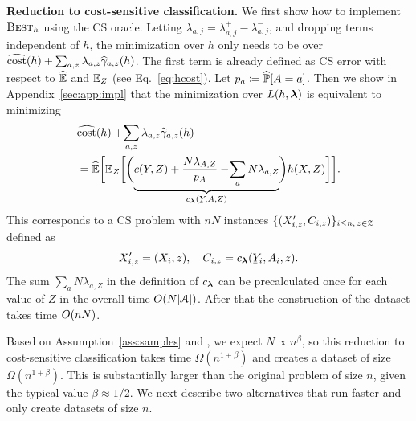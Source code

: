 \documentclass{article}
\begin{document}
\textbf{Reduction to cost-sensitive classification.}
We first show how to implement $\textsc{\mdseries Best}_h$ using the CS oracle.
Letting $\lambda_{a,j}=\lambda^+_{a,j}-\lambda^-_{a,j}$, and dropping terms independent of $h$, the minimization over $h$ only needs to be over $\widehat{\textup{\mdseries cost}}(h) + \sum_{a,z}\lambda_{a,z}\widehat{\gamma}_{a,z}(h)$.
The first term is already defined as CS error with respect to $\widehat{\mathbb{E}}$ and $\mathbb{E}_Z$ (see Eq.~\ref{eq:hcost}). Let $p_{a}\coloneqq\widehat{\mathbb{P}}[A=a]$. Then we show in Appendix~\ref{sec:app:impl} that the minimization over $L(h,\boldsymbol{\lambda})$ is equivalent to minimizing
%
\begin{align}
\label{eq:c:lambda}
&
  \hcost(h)
  +
  \!\sum_{a,z}\lambda_{a,z}\hgamma_{a,z}(h)
\\
\notag
&=
  \Ehat\biggBracks{
  \E_Z\biggBracks{
  \biggParens{
  \underbrace{
     c(\underY,Z)+
     \frac{N\lambda_{A,Z}}{p_A} -\!\sum_a N\lambda_{a,Z}
  }_{c_{\vlambda}(\underY,A,Z)}
  }
  h(X,Z)
  }}.
\end{align}
%
This corresponds to a CS problem
with $nN$ instances $\{(X'_{i,z},C_{i,z})\}_{i\le n,\,z\in\mathcal{Z}}$ defined as
\[
  X'_{i,z}=(X_i,z),
\quad
  C_{i,z}=c_{\vlambda}(\underY_i,A_i,z)
.
\]
The sum $\sum_a N\lambda_{a,Z}$ in the definition of $c_{\boldsymbol{\lambda}}$ can
be precalculated once for each value of $Z$ in the overall time $O(N\lvert\mathcal{A}\rvert)$.
After that the construction of the dataset takes time $O(nN)$.

Based on Assumption~\ref{ass:samples} and , we expect $N\propto n^{\beta}$, so
this reduction to cost-sensitive classification takes time $\Omega(n^{1+\beta})$ and creates a dataset of size $\Omega(n^{1+\beta})$. This is substantially larger than the original problem of size $n$, given the typical value $\beta\approx 1/2$. We next describe two alternatives that run faster and only create datasets of size $n$. %
\end{document}
